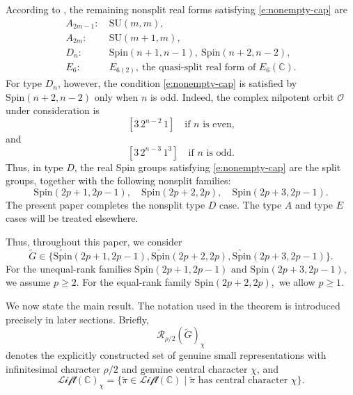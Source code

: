\documentclass{amsart}
\newcommand{\LLift}{\mathscr{Lift}}
\newcommand{\bbC}{{\mathbb{C}}}
\newcommand{\Spin}{{\mathrm{Spin}}}
\newcommand{\SU}{\mathrm{SU}}
\theoremstyle{definition}
\newcommand{\calO}{{\mathcal{O}}}
\newcommand{\calR}{{\mathcal{R}}}
\newcommand{\tu}{\widetilde}
\begin{document}
According to \cite[Table 2]{Ts19}, the remaining nonsplit real forms satisfying
\eqref{e:nonempty-cap} are
\begin{align*}
A_{2m-1}: \ & \SU(m,m),\\
A_{2m}: \ & \SU(m+1,m),\\
D_n:\  & \Spin(n+1,n-1),\ \Spin(n+2,n-2),\\
E_6: \ & E_{6(2)}, \ \text{the quasi-split real form of } E_6(\bbC).
\end{align*}
For type \(D_n\), however, the condition \eqref{e:nonempty-cap} is satisfied
by \(\Spin(n+2,n-2)\) only when \(n\) is odd. Indeed, the complex nilpotent
orbit \(\calO\) under consideration is
\[
[3\,2^{n-2}\,1]
\quad\text{if \(n\) is even,}
\]
and
\[
[3\,2^{n-3}\,1^3]
\quad\text{if \(n\) is odd.}
\]
Thus, in type \(D\), the real Spin groups satisfying \eqref{e:nonempty-cap}
are the split groups, together with the following nonsplit families:
\[
\Spin(2p+1,2p-1),\quad
\Spin(2p+2,2p),\quad
\Spin(2p+3,2p-1).
\]
The present paper completes the nonsplit type \(D\) case. The type \(A\) and
type \(E\) cases will be treated elsewhere.

Thus, throughout this paper, we consider
\[
\tu G\in
\{\tu{\Spin}(2p+1,2p-1),
\tu{\Spin}(2p+2,2p),
\tu{\Spin}(2p+3,2p-1)\}.
\]
For the unequal-rank families
$\Spin(2p+1,2p-1)
\text{ and } 
\Spin(2p+3,2p-1),$
we assume \(p\geq 2\). For the equal-rank family $\Spin(2p+2,2p),$
we allow \(p\geq 1\).


We now state the main result. The notation used in the theorem is introduced
precisely in later sections. Briefly,
\[
\calR_{\rho/2}(\tu G)_\chi
\]
denotes the explicitly constructed set of genuine small representations with
infinitesimal character $\rho/2$ and genuine central character $\chi$, and
\[
\LLift(\bbC)_\chi
=
\{\tu\pi\in\LLift(\bbC)\mid \tu\pi
\text{ has central character } \chi\}.
\]
\end{document}
